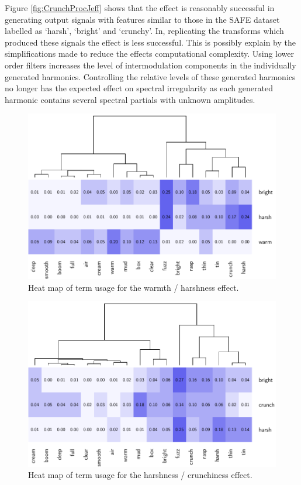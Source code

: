 		Figure \ref{fig:CrunchProcJeff} shows that the effect is reasonably successful in generating output signals
		with features similar to those in the SAFE dataset labelled as `harsh', `bright' and `crunchy'. In,
		replicating the transforms which produced these signals the effect is less successful. This is possibly
		explain by the simplifications made to reduce the effects computational complexity. Using lower order
		filters increases the level of intermodulation components in the individually generated harmonics.
		Controlling the relative levels of these generated harmonics no longer has the expected effect on spectral
		irregularity as each generated harmonic contains several spectral partials with unknown amplitudes.

		\begin{figure}[h!]
			\centering
			\includegraphics{chapter7/Images/HarshConfusion.pdf}
			\caption{Heat map of term usage for the warmth / harshness effect.}
			\label{fig:HarshConfusion}
		\end{figure}

		\begin{figure}[h!]
			\centering
			\includegraphics{chapter7/Images/CrunchConfusion.pdf}
			\caption{Heat map of term usage for the harshness / crunchiness effect.}
			\label{fig:CrunchConfusion}
		\end{figure}

